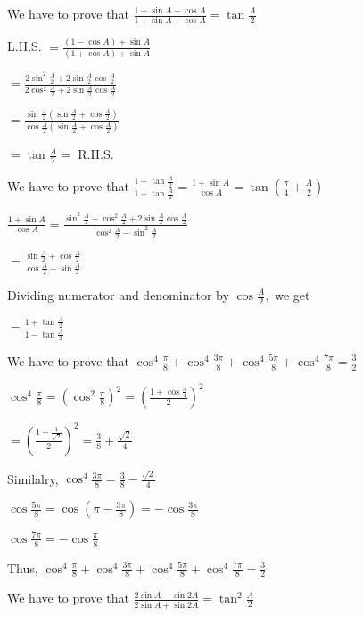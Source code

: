 \item We have to prove that $\frac{1 + \sin A - \cos A}{1 + \sin A + \cos A} = \tan \frac{A}{2}$

  L.H.S. $= \frac{(1 - \cos A) + \sin A}{(1 + \cos A) + \sin A}$

  $= \frac{2\sin^2\frac{A}{2} + 2\sin\frac{A}{2}\cos\frac{A}{2}}{2\cos^2\frac{A}{2} + 2\sin\frac{A}{2}\cos\frac{A}{2}}$

  $= \frac{\sin\frac{A}{2}\left(\sin\frac{A}{2} + \cos\frac{A}{2}\right)}{\cos\frac{A}{2}\left(\sin\frac{A}{2} +
    \cos\frac{A}{2}\right)}$

  $= \tan\frac{A}{2} =$ R.H.S.

\item We have to prove that $\frac{1 - \tan \frac{A}{2}}{1 + \tan \frac{A}{2}} = \frac{1 + \sin A}{\cos A} = \tan
  \left(\frac{\pi}{4} + \frac{A}{2}\right)$

  $\frac{1 + \sin A}{\cos A} = \frac{\sin^2\frac{A}{2} + \cos^2\frac{A}{2} + 2\sin\frac{A}{2}\cos
    \frac{A}{2}}{\cos^2\frac{A}{2} - \sin^2\frac{A}{2}}$

  $= \frac{\sin\frac{A}{2} + \cos\frac{A}{2}}{\cos \frac{A}{2} - \sin \frac{A}{2}}$

  Dividing numerator and denominator by $\cos \frac{A}{2},$ we get

  $= \frac{1 + \tan \frac{A}{2}}{1 - \tan \frac{A}{2}}$

\item We have to prove that $\cos^4\frac{\pi}{8} + \cos^4 \frac{3\pi}{8} + \cos^4\frac{5\pi}{8} + \cos^4\frac{7\pi}{8}=
  \frac{3}{2}$

  $\cos^4\frac{\pi}{8} = \left(\cos^2\frac{\pi}{8}\right)^2 = \left(\frac{1 + \cos\frac{\pi}{4}}{2}\right)^2$

  $= \left(\frac{1 + \frac{1}{\sqrt{2}}}{2}\right)^2 = \frac{3}{8} + \frac{\sqrt{2}}{4}$

  Similalry, $\cos^4\frac{3\pi}{8} = \frac{3}{8} - \frac{\sqrt{2}}{4}$

  $\cos\frac{5\pi}{8} = \cos\left(\pi - \frac{3\pi}{8}\right) = -\cos\frac{3\pi}{8}$

  $\cos\frac{7\pi}{8} = -\cos\frac{\pi}{8}$

  Thus, $\cos^4\frac{\pi}{8} + \cos^4 \frac{3\pi}{8} + \cos^4\frac{5\pi}{8} + \cos^4\frac{7\pi}{8}=
  \frac{3}{2}$

\item We have to prove that $\frac{2\sin A - \sin2A}{2\sin A + \sin 2A} = \tan^2\frac{A}{2}$

